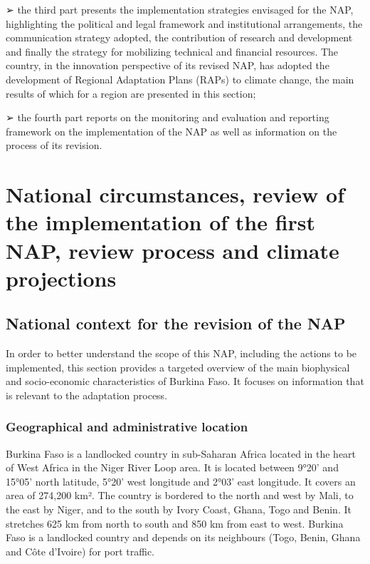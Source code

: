\documentclass[
]{book}
\begin{document}
➢ the third part presents the implementation strategies envisaged for the NAP, highlighting the political and legal framework and institutional arrangements, the communication strategy adopted, the contribution of research and development and finally the strategy for mobilizing technical and financial resources. The country, in the innovation perspective of its revised NAP, has adopted the development of Regional Adaptation Plans (RAPs) to climate change, the main results of which for a region are presented in this section;

➢ the fourth part reports on the monitoring and evaluation and reporting framework on the implementation of the NAP as well as information on the process of its revision.

\chapter{National circumstances, review of the implementation of the first NAP, review process and climate projections}\label{national-circumstances-review-of-the-implementation-of-the-first-nap-review-process-and-climate-projections}

\section{National context for the revision of the NAP}\label{national-context-for-the-revision-of-the-nap}

In order to better understand the scope of this NAP, including the actions to be implemented, this section provides a targeted overview of the main biophysical and socio-economic characteristics of Burkina Faso. It focuses on information that is relevant to the adaptation process.

\subsection{Geographical and administrative location}\label{geographical-and-administrative-location}

Burkina Faso is a landlocked country in sub-Saharan Africa located in the heart of West Africa in the Niger River Loop area. It is located between 9°20' and 15°05' north latitude, 5°20' west longitude and 2°03' east longitude. It covers an area of 274,200 km². The country is bordered to the north and west by Mali, to the east by Niger, and to the south by Ivory Coast, Ghana, Togo and Benin. It stretches 625 km from north to south and 850 km from east to west. Burkina Faso is a landlocked country and depends on its neighbours (Togo, Benin, Ghana and Côte d'Ivoire) for port traffic.
\end{document}
